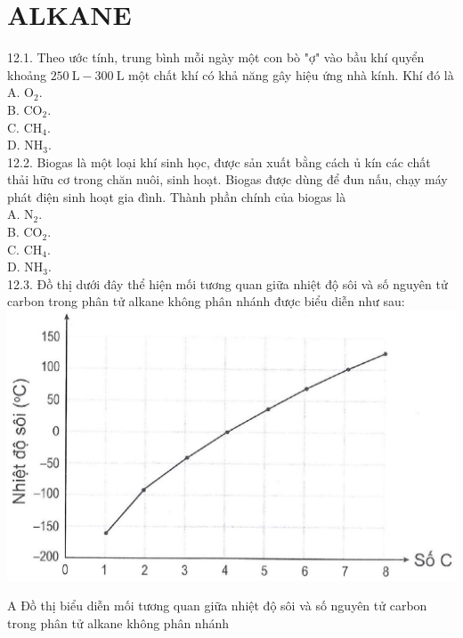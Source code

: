\documentclass[10pt]{article}
\begin{document}
\section*{ALKANE}
12.1. Theo ước tính, trung bình mỗi ngày một con bò "ợ" vào bầu khí quyển khoảng $250 \mathrm{~L}-300 \mathrm{~L}$ một chất khí có khả năng gây hiệu ứng nhà kính. Khí đó là\\
A. $\mathrm{O}_{2}$.\\
B. $\mathrm{CO}_{2}$.\\
C. $\mathrm{CH}_{4}$.\\
D. $\mathrm{NH}_{3}$.\\
12.2. Biogas là một loại khí sinh học, được sản xuất bằng cách ủ kín các chất thải hữu cơ trong chăn nuôi, sinh hoạt. Biogas được dùng để đun nấu, chạy máy phát điện sinh hoạt gia đình. Thành phần chính của biogas là\\
A. $\mathrm{N}_{2}$.\\
B. $\mathrm{CO}_{2}$.\\
C. $\mathrm{CH}_{4}$.\\
D. $\mathrm{NH}_{3}$.\\
12.3. Đồ thị dưới đây thể hiện mối tương quan giữa nhiệt độ sôi và số nguyên tử carbon trong phân tử alkane không phân nhánh được biểu diễn như sau:\\
\includegraphics[max width=\textwidth, center]{2025_10_23_ae7aef68fb3b41082d29g-23(2)}

A Đồ thị biểu diễn mối tương quan giữa nhiệt độ sôi và số nguyên tử carbon trong phân tử alkane không phân nhánh
\end{document}
